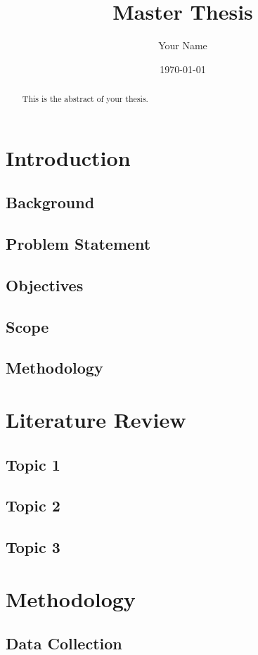 \documentclass{report}
\title{Master Thesis}
\author{Your Name}
\date{\today}
\begin{document}
\maketitle

\begin{abstract}
This is the abstract of your thesis.
\end{abstract}

\tableofcontents

\chapter{Introduction}
\section{Background}
\section{Problem Statement}
\section{Objectives}
\section{Scope}
\section{Methodology}

\chapter{Literature Review}
\section{Topic 1}
\section{Topic 2}
\section{Topic 3}

\chapter{Methodology}
\section{Data Collection}
\end{document}
